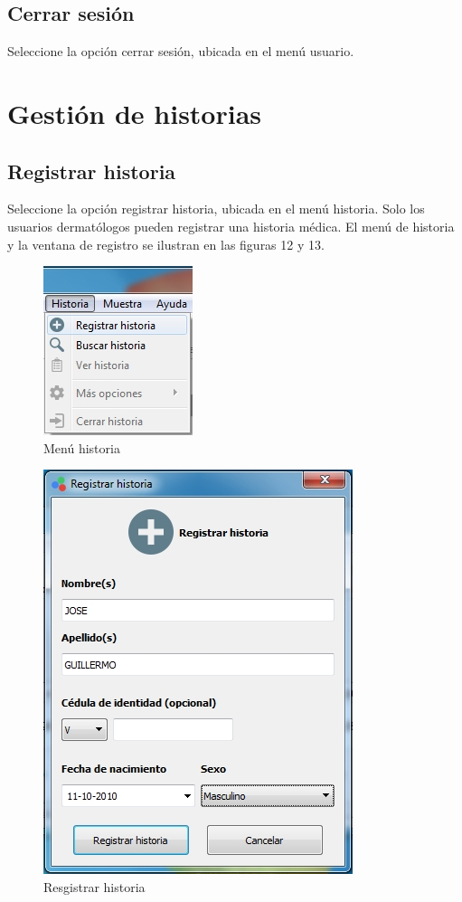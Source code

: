 \begin{figure}[H]
\begin{minipage}{.5\textwidth}
  \label{fig:test2}
\end{minipage}
\end{figure}

	\subsection{Cerrar sesi\'{o}n}
	
	Seleccione la opci\'{o}n cerrar sesi\'{o}n, ubicada en el men\'{u} usuario.

\newpage

\section{Gesti\'{o}n de historias}

	\subsection{Registrar historia}
	
	Seleccione la opci\'{o}n registrar historia, ubicada en el men\'{u} historia. Solo los usuarios dermat\'{o}logos pueden registrar una historia m\'{e}dica. El men\'{u} de historia y la ventana de registro se ilustran en las figuras 12 y 13.

\begin{figure}[H]
  \centering
  \includegraphics[width=.3\linewidth]{./img/menu-historia.jpg}
\caption{Men\'{u} historia}
\end{figure}

\begin{figure}[H]
  \centering
  \includegraphics[width=.4\linewidth]{./img/registrar-historia.jpg}
\caption{Resgistrar historia}
\end{figure}

